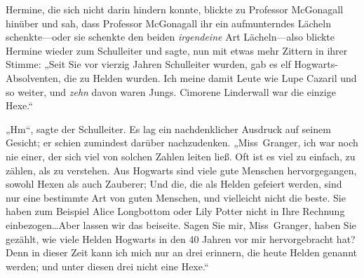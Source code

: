 Hermine, die sich nicht darin hindern konnte, blickte zu Professor McGonagall hinüber und sah, dass Professor McGonagall ihr ein aufmunterndes Lächeln schenkte—oder sie schenkte den beiden \emph{irgendeine} Art Lächeln—also blickte Hermine wieder zum Schulleiter und sagte, nun mit etwas mehr Zittern in ihrer Stimme:
„Seit Sie vor vierzig Jahren Schulleiter wurden, gab es elf Hogwarts-Absolventen, die zu Helden wurden. Ich meine damit Leute wie Lupe Cazaril und so weiter, und \emph{zehn} davon waren Jungs. Cimorene Linderwall war die einzige Hexe.“

„Hm“, sagte der Schulleiter. Es lag ein nachdenklicher Ausdruck auf seinem Gesicht; er schien zumindest darüber nachzudenken.
„Miss~Granger, ich war noch nie einer, der sich viel von solchen Zahlen leiten ließ. Oft ist es viel zu einfach, zu zählen, als zu verstehen. Aus Hogwarts sind viele gute Menschen hervorgegangen, sowohl Hexen als auch Zauberer; Und die, die als Helden gefeiert werden, sind nur eine bestimmte Art von guten Menschen, und vielleicht nicht die beste. Sie haben zum Beispiel Alice Longbottom oder Lily Potter nicht in Ihre Rechnung einbezogen…Aber lassen wir das beiseite. Sagen Sie mir, Miss~Granger, haben Sie gezählt, wie viele Helden Hogwarts in den 40 Jahren vor mir hervorgebracht hat? Denn in dieser Zeit kann ich mich nur an drei erinnern, die heute Helden genannt werden; und unter diesen drei nicht eine Hexe.“

